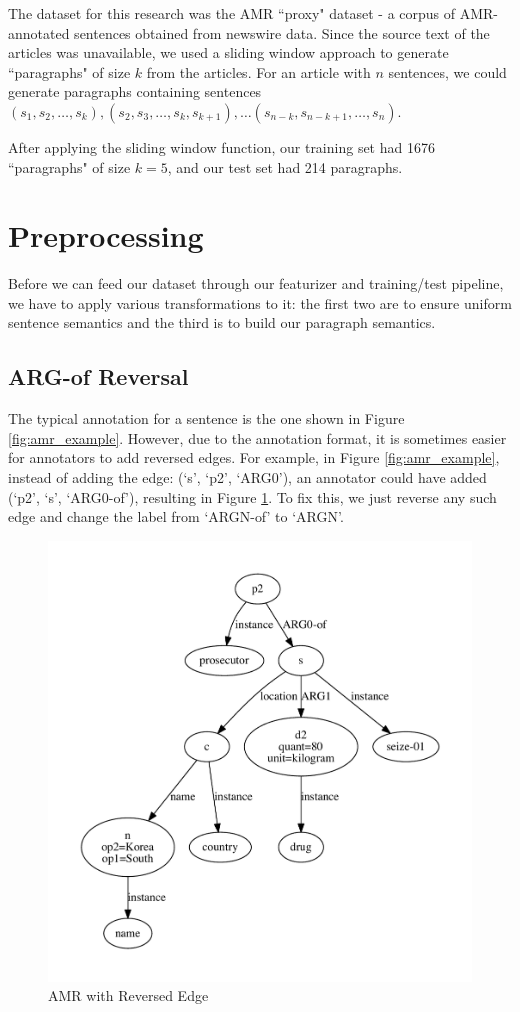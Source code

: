 \documentclass[12pt]{article}
\begin{document}
The dataset for this research was the AMR ``proxy" dataset - a corpus of
AMR-annotated sentences obtained from newswire data. Since the source text of
the articles was unavailable, we used a sliding window approach to generate
``paragraphs" of size $k$ from the articles. For an article with $n$ sentences,
we could generate paragraphs containing sentences $(s_1,s_2,\ldots,s_k),
(s_2,s_3,\ldots,s_k,s_{k+1}), \ldots (s_{n-k},s_{n-k+1},\ldots,s_n)$.

After applying the sliding window function, our training set had 1676 ``paragraphs" of size $k=5$, and our test set had 214 paragraphs.

\section{Preprocessing}
Before we can feed our dataset through our featurizer and training/test pipeline, we have to apply various transformations to it: the first two are to ensure uniform sentence semantics and the third is to build our paragraph semantics.

\subsection{ARG-of Reversal}
The typical annotation for a sentence is the one shown in Figure \ref{fig:amr_example}. However, due to the annotation format, it is sometimes easier for annotators to add reversed edges. For example, in Figure \ref{fig:amr_example}, instead of adding the edge: (`s', `p2', `ARG0'), an annotator could have added (`p2', `s', `ARG0-of'), resulting in Figure \ref{fig:amr_example_argof}. To fix this, we just reverse any such edge and change the label from `ARGN-of' to `ARGN'.

\begin{figure}
\includegraphics[width=\linewidth]{amr_example_argof.pdf}
\caption{AMR with Reversed Edge}
\label{fig:amr_example_argof}
\end{figure}
\end{document}
